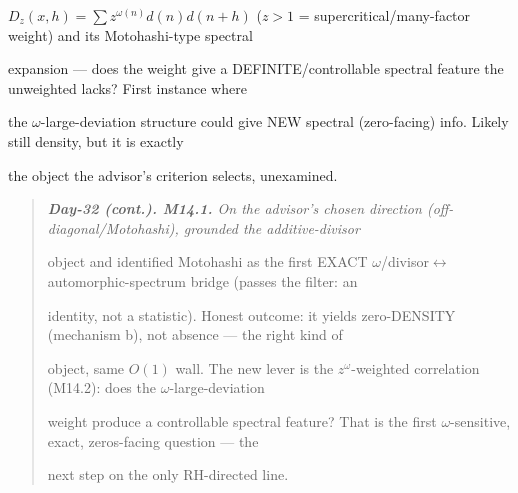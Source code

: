 \documentclass[10pt]{article}
\begin{document}
  $D_z(x,h)=\sum z^{\omega(n)}d(n)d(n+h)$ ($z>1$ = supercritical/many-factor weight) and its Motohashi-type spectral\par
  expansion --- does the weight give a DEFINITE/controllable spectral feature the unweighted lacks? First instance where\par
  the \ensuremath{\omega}-large-deviation structure could give NEW spectral (zero-facing) info. Likely still density, but it is exactly\par
  the object the advisor's criterion selects, unexamined.\par

\begin{quote}\itshape
\textbf{Day-32 (cont.). M14.1.} On the advisor's chosen direction (off-diagonal/Motohashi), grounded the additive-divisor\par
object and identified Motohashi as the first EXACT \ensuremath{\omega}/divisor\ensuremath{\leftrightarrow}automorphic-spectrum bridge (passes the filter: an\par
identity, not a statistic). Honest outcome: it yields zero-DENSITY (mechanism b), not absence --- the right kind of\par
object, same $O(1)$ wall. The new lever is the $z^\omega$-weighted correlation (M14.2): does the \ensuremath{\omega}-large-deviation\par
weight produce a controllable spectral feature? That is the first \ensuremath{\omega}-sensitive, exact, zeros-facing question --- the\par
next step on the only RH-directed line.\par
\end{quote}
\end{document}
